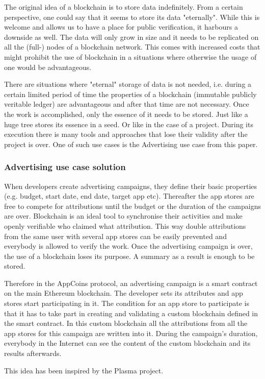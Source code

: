 The original idea of a blockchain is to store data indefinitely. From a certain perspective, one could say that it seems to store its data "eternally". While this is welcome and allows us to have a place for public verification, it harbours a downside as well. The data will only grow in size and it needs to be replicated on all the (full-) nodes of a blockchain network. This comes with increased costs that might prohibit the use of blockchain in a situations where otherwise the usage of one would be advantageous.

There are situations where "eternal" storage of data is not needed, i.e. during a certain limited period of time the properties of a blockchain (immutable publicly veritable ledger) are advantageous and after that time are not necessary. Once the work is accomplished, only the essence of it needs to be stored. Just like a huge tree stores its essence in a seed. Or like in the case of a project. During its execution there is many tools and approaches that lose their validity after the project is over. One of such use cases is the Advertising use case from this paper. 

\subsubsection{Advertising use case solution}

When developers create advertising campaigns, they define their basic properties (e.g. budget, start date, end date, target app etc). Thereafter the app stores are free to compete for attributions until the budget or the duration of the campaigns are over. Blockchain is an ideal tool to synchronise their activities and make openly verifiable who claimed what attribution. This way double attributions from the same user with several app stores can be easily prevented and everybody is allowed to verify the work. Once the advertising campaign is over, the use of a blockchain loses its purpose. A summary as a result is enough to be stored. 

Therefore in the AppCoins protocol, an advertising campaign is a smart contract on the main Ethereum blockchain. The developer sets its attributes and app stores start participating in it. The condition for an app store to participate is that it has to take part in creating and validating a custom blockchain defined in the smart contract. In this custom blockchain all the attributions from all the app stores for this campaign are written into it. During the campaign's duration, everybody in the Internet can see the content of the custom blockchain and its results afterwards. 

This idea has been inspired by the Plasma \cite{plasma} project.
